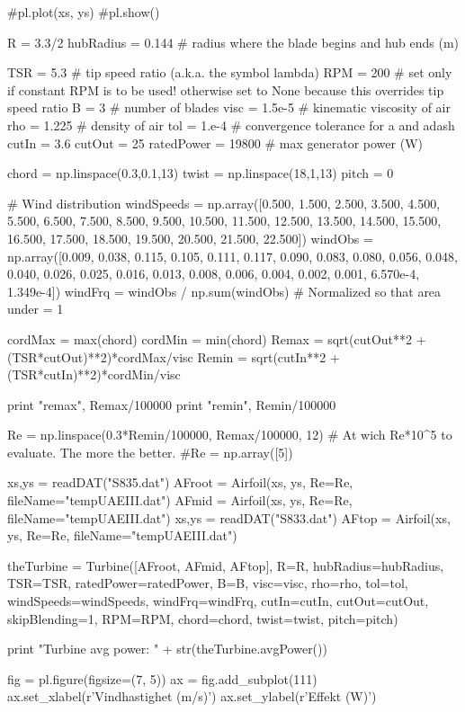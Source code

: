 \begin{pythoncode}
#pl.plot(xs, ys)
#pl.show()


R = 3.3/2
hubRadius = 0.144 # radius where the blade begins and hub ends (m)

TSR = 5.3 # tip speed ratio (a.k.a. the symbol lambda)
RPM = 200 # set only if constant RPM is to be used! otherwise set to None because this overrides tip speed ratio
B = 3 # number of blades
visc = 1.5e-5 # kinematic viscosity of air 
rho = 1.225 # density of air 
tol = 1.e-4 # convergence tolerance for a and adash
cutIn = 3.6
cutOut = 25
ratedPower = 19800 # max generator power (W)

chord = np.linspace(0.3,0.1,13)
twist = np.linspace(18,1,13)
pitch = 0

# Wind distribution
windSpeeds = np.array([0.500, 1.500, 2.500, 3.500, 4.500, 5.500, 6.500, 7.500, 8.500, 9.500, 10.500, 11.500, 12.500, 13.500, 14.500, 15.500, 16.500, 17.500, 18.500, 19.500, 20.500, 21.500, 22.500])
windObs = np.array([0.009, 0.038, 0.115, 0.105, 0.111, 0.117, 0.090, 0.083, 0.080, 0.056, 0.048, 0.040, 0.026, 0.025, 0.016, 0.013, 0.008, 0.006, 0.004, 0.002, 0.001, 6.570e-4, 1.349e-4])
windFrq = windObs / np.sum(windObs) # Normalized so that area under = 1

cordMax = max(chord)
cordMin = min(chord)
Remax = sqrt(cutOut**2 + (TSR*cutOut)**2)*cordMax/visc
Remin = sqrt(cutIn**2 + (TSR*cutIn)**2)*cordMin/visc

print "remax", Remax/100000
print "remin", Remin/100000

Re = np.linspace(0.3*Remin/100000, Remax/100000, 12) # At wich Re*10^5 to evaluate. The more the better.
#Re = np.array([5])

xs,ys = readDAT("S835.dat")
AFroot = Airfoil(xs, ys, Re=Re, fileName="tempUAEIII.dat")
AFmid = Airfoil(xs, ys, Re=Re, fileName="tempUAEIII.dat")
xs,ys = readDAT("S833.dat")
AFtop = Airfoil(xs, ys, Re=Re, fileName="tempUAEIII.dat")


theTurbine = Turbine([AFroot, AFmid, AFtop], R=R, hubRadius=hubRadius, TSR=TSR, 
                      ratedPower=ratedPower, B=B, visc=visc, rho=rho, tol=tol, 
                      windSpeeds=windSpeeds, windFrq=windFrq, cutIn=cutIn, 
                      cutOut=cutOut, skipBlending=1, RPM=RPM,
                      chord=chord, twist=twist, pitch=pitch)


print "Turbine avg power: " + str(theTurbine.avgPower()) 



fig = pl.figure(figsize=(7, 5))
ax = fig.add_subplot(111)
ax.set_xlabel(r'Vindhastighet (m/s)')
ax.set_ylabel(r'Effekt (W)')


\end{pythoncode}
